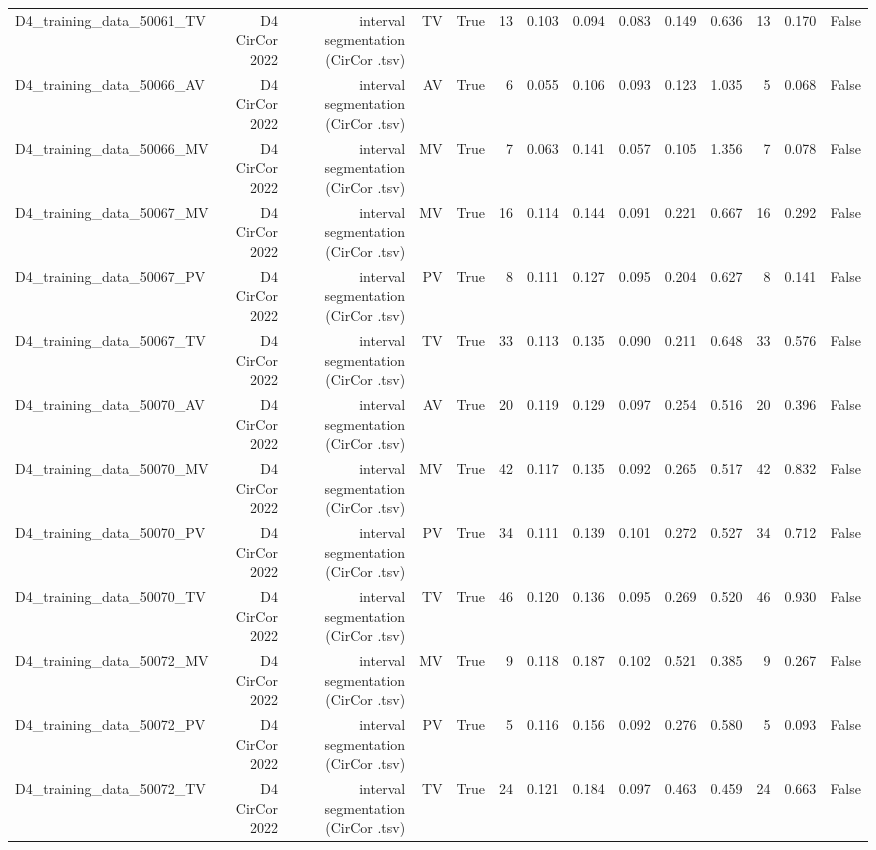 \begin{table}[htbp]
\begin{tabular}{lrrrrrrrrrrrrr}
    D4\_training\_data\_50061\_TV & D4 CirCor 2022 & interval segmentation (CirCor .tsv) & TV & True & 13 & 0.103 & 0.094 & 0.083 & 0.149 & 0.636 & 13 & 0.170 & False \\
    D4\_training\_data\_50066\_AV & D4 CirCor 2022 & interval segmentation (CirCor .tsv) & AV & True & 6 & 0.055 & 0.106 & 0.093 & 0.123 & 1.035 & 5 & 0.068 & False \\
    D4\_training\_data\_50066\_MV & D4 CirCor 2022 & interval segmentation (CirCor .tsv) & MV & True & 7 & 0.063 & 0.141 & 0.057 & 0.105 & 1.356 & 7 & 0.078 & False \\
    D4\_training\_data\_50067\_MV & D4 CirCor 2022 & interval segmentation (CirCor .tsv) & MV & True & 16 & 0.114 & 0.144 & 0.091 & 0.221 & 0.667 & 16 & 0.292 & False \\
    D4\_training\_data\_50067\_PV & D4 CirCor 2022 & interval segmentation (CirCor .tsv) & PV & True & 8 & 0.111 & 0.127 & 0.095 & 0.204 & 0.627 & 8 & 0.141 & False \\
    D4\_training\_data\_50067\_TV & D4 CirCor 2022 & interval segmentation (CirCor .tsv) & TV & True & 33 & 0.113 & 0.135 & 0.090 & 0.211 & 0.648 & 33 & 0.576 & False \\
    D4\_training\_data\_50070\_AV & D4 CirCor 2022 & interval segmentation (CirCor .tsv) & AV & True & 20 & 0.119 & 0.129 & 0.097 & 0.254 & 0.516 & 20 & 0.396 & False \\
    D4\_training\_data\_50070\_MV & D4 CirCor 2022 & interval segmentation (CirCor .tsv) & MV & True & 42 & 0.117 & 0.135 & 0.092 & 0.265 & 0.517 & 42 & 0.832 & False \\
    D4\_training\_data\_50070\_PV & D4 CirCor 2022 & interval segmentation (CirCor .tsv) & PV & True & 34 & 0.111 & 0.139 & 0.101 & 0.272 & 0.527 & 34 & 0.712 & False \\
    D4\_training\_data\_50070\_TV & D4 CirCor 2022 & interval segmentation (CirCor .tsv) & TV & True & 46 & 0.120 & 0.136 & 0.095 & 0.269 & 0.520 & 46 & 0.930 & False \\
    D4\_training\_data\_50072\_MV & D4 CirCor 2022 & interval segmentation (CirCor .tsv) & MV & True & 9 & 0.118 & 0.187 & 0.102 & 0.521 & 0.385 & 9 & 0.267 & False \\
    D4\_training\_data\_50072\_PV & D4 CirCor 2022 & interval segmentation (CirCor .tsv) & PV & True & 5 & 0.116 & 0.156 & 0.092 & 0.276 & 0.580 & 5 & 0.093 & False \\
    D4\_training\_data\_50072\_TV & D4 CirCor 2022 & interval segmentation (CirCor .tsv) & TV & True & 24 & 0.121 & 0.184 & 0.097 & 0.463 & 0.459 & 24 & 0.663 & False \\

\end{tabular}
\end{table}
